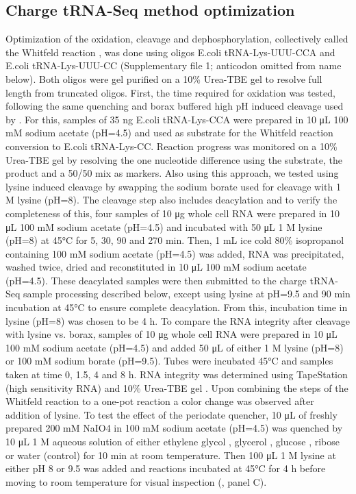 \documentclass[9pt,lineno]{elife}
\begin{document}
\subsection{Charge tRNA-Seq method optimization}
Optimization of the oxidation, cleavage and dephosphorylation, collectively called the Whitfeld reaction \citep{Whitfeld1953-ca}, was done using oligos E.coli tRNA-Lys-UUU-CCA and E.coli tRNA-Lys-UUU-CC (Supplementary file 1; anticodon omitted from name below).
Both oligos were gel purified on a 10\% Urea-TBE gel to resolve full length from truncated oligos.
First, the time required for oxidation was tested, following the same quenching and borax buffered high pH induced cleavage used by \cite{Evans2017-st}.
For this, samples of 35 ng E.coli tRNA-Lys-CCA were prepared in 10 μL 100 mM sodium acetate (pH=4.5) and used as substrate for the Whitfeld reaction conversion to E.coli tRNA-Lys-CC.
Reaction progress was monitored on a 10\% Urea-TBE gel by resolving the one nucleotide difference using the substrate, the product and a 50/50 mix as markers.
Also using this approach, we tested using lysine induced cleavage \citep{Khym1961-xf} by swapping the sodium borate used for cleavage with 1 M lysine (pH=8).
The cleavage step also includes deacylation and to verify the completeness of this, four samples of 10 μg whole cell RNA were prepared in 10 μL 100 mM sodium acetate (pH=4.5) and incubated with 50 μL 1 M lysine (pH=8) at 45°C for 5, 30, 90 and 270 min.
Then, 1 mL ice cold 80\% isopropanol containing 100 mM sodium acetate (pH=4.5) was added, RNA was precipitated, washed twice, dried and reconstituted in 10 μL 100 mM sodium acetate (pH=4.5).
These deacylated samples were then submitted to the charge tRNA-Seq sample processing described below, except using lysine at pH=9.5 and 90 min incubation at 45°C to ensure complete deacylation.
From this, incubation time in lysine (pH=8) was chosen to be 4 h.
To compare the RNA integrity after cleavage with lysine vs. borax, samples of 10 μg whole cell RNA were prepared in 10 μL 100 mM sodium acetate (pH=4.5) and added 50 μL of either 1 M lysine (pH=8) or 100 mM sodium borate (pH=9.5).
Tubes were incubated 45°C and samples taken at time 0, 1.5, 4 and 8 h.
RNA integrity was determined using TapeStation (high sensitivity RNA) and 10\% Urea-TBE gel .
Upon combining the steps of the Whitfeld reaction to a one-pot reaction a color change was observed after addition of lysine.
To test the effect of the periodate quencher, 10 μL of freshly prepared 200 mM NaIO4 in 100 mM sodium acetate (pH=4.5) was quenched by 10 μL 1 M aqueous solution of either 
ethylene glycol \citep{Neu1964-hu}, glycerol \citep{Alefelder1998-ln}, glucose \citep{Evans2017-st}, ribose \citep{Watkins2022-er} or water (control) for 10 min at room temperature.
Then 100 μL 1 M lysine at either pH 8 or 9.5 was added and reactions incubated at 45°C for 4 h before moving to room temperature for visual inspection (, panel C).
\end{document}
